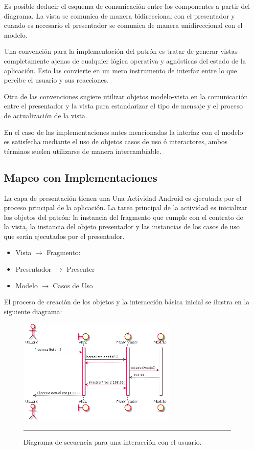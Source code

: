 Es posible deducir el esquema de comunicación entre los componentes a partir del diagrama. La vista se comunica de manera bidireccional con el presentador y cuando es necesario el presentador se comunica de manera unidireccional con el modelo.


Una convención para la implementación del patrón es tratar de generar vistas completamente ajenas de cualquier lógica operativa y agnósticas del estado de la aplicación. Esto las convierte en un mero instrumento de interfaz entre lo que percibe el usuario y sus reacciones. 

Otra de las convenciones sugiere utilizar objetos modelo-vista en la comunicación entre el presentador y la vista para estandarizar el tipo de mensaje y el proceso de actualización de la vista.

En el caso de las implementaciones antes mencionadas la interfaz con el modelo es satisfecha mediante el uso de objetos casos de uso ó interactores, ambos términos suelen utilizarse de manera intercambiable.

\subsection{Mapeo con Implementaciones}
La capa de presentación tienen una
Una Actividad Android es ejecutada por el proceso principal de la aplicación. La tarea principal de la actividad es inicializar los objetos del patrón: la instancia del fragmento que cumple con el contrato de la vista, la instancia del objeto presentador y las instancias de los casos de uso que serán ejecutados por el presentador.
\begin{itemize}
	\item Vista $\rightarrow$ Fragmento: 
	\item Presentador $\rightarrow$ Presenter
	\item Modelo $\rightarrow$ Casos de Uso
\end{itemize}

El proceso de creación de los objetos y la interacción básica inicial se ilustra en la siguiente diagrama:

\begin{figure}[htbp]
	\centering
	\includegraphics[width=0.7\textwidth]{Figures/uml_mvp_sequence.png}
	\rule{35em}{1pt}
	\caption[MVP Sequence]{Diagrama de secuencia para una interacción con el usuario.}
	\label{fig:uml_mvp_sequence}
\end{figure}

